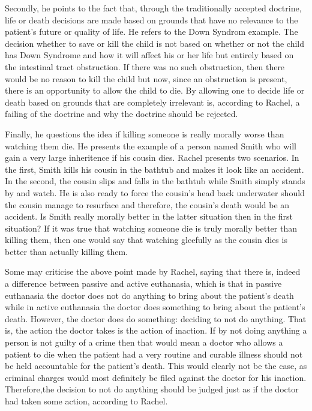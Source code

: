 \documentclass{article}
\begin{document}
Secondly, he points to the fact that, through the traditionally accepted doctrine,
life or death decisions are made based on grounds that have no relevance to the patient's
future or quality of life. He refers to the Down Syndrom example. The decision
whether to save or kill the child is not based on whether or not the child has
Down Syndrome and how it will affect his or her life but entirely based on
the intestinal tract obstruction. If there was no such obstruction, then there
would be no reason to kill the child but now, since an obstruction is present,
there is an opportunity to allow the child to die. By allowing one to decide life
or death based on grounds that are completely irrelevant is, according to Rachel,
a failing of the doctrine and why the doctrine should be rejected.

Finally, he questions the idea if killing someone is really morally worse than watching
them die. He presents the example of a person named Smith who will gain a very large
inheritence if his cousin dies. Rachel presents two scenarios. In the first, Smith
kills his cousin in the bathtub and makes it look like an accident. In the second,
the cousin slips and falls in the bathtub while Smith simply stands by and watch. He
is also ready to force the cousin's head back underwater should the cousin manage to
resurface and therefore, the cousin's death would be an accident. Is Smith really
morally better in the latter situation then in the first situation? If it was true
that watching someone die is truly morally better than killing them, then one would
say that watching gleefully as the cousin dies is better than actually killing them.

Some may criticise the above point made by Rachel, saying that there is, indeed a
difference between passive and active euthanasia, which is that in passive euthanasia
the doctor does not do anything to bring about the patient's death while in active
euthanasia the doctor does something to bring about the patient's death. However, the
doctor does do something: deciding to not do anything. That is, the action the doctor
takes is the action of inaction. If by not doing anything a person is not guilty of
a crime then that would mean a doctor who allows a patient to die when the patient
had a very routine and curable illness should not be held accountable for the patient's
death. This would clearly not be the case, as criminal charges would most definitely
be filed against the doctor for his inaction. Therefore,the decision to not do anything
should be judged just as if the doctor had taken some action, according to Rachel.
\end{document}

